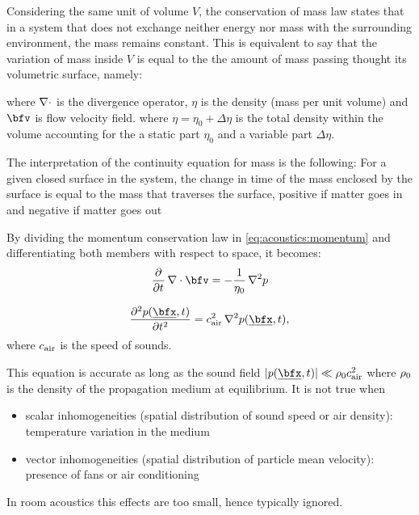 Considering the same unit of volume $V$, the conservation of mass law states that in a system that does not exchange
neither energy nor mass with the surrounding environment, the mass remains constant.
This is equivalent to say that the variation of mass inside $V$ is equal to the the amount of mass passing thought its volumetric surface, namely:


where $\mathop{}\!\mathbin{\nabla}\cdot$ is the divergence operator, $\eta$ is the density (mass per unit volume) and $\bfv$ is flow velocity field.
where $\eta = \eta_0 + \Delta\eta$ is the total density within the volume accounting for the a static part $\eta_0$ and a variable part $\Delta\eta$.

The interpretation of the continuity equation for mass is the following: For a given closed surface in the system,
the change in time of the mass enclosed by the surface is equal to the mass that traverses the surface, positive if matter goes in and negative if matter goes out

By dividing the momentum conservation law in \cref{eq:acoustics:momentum} and differentiating both members with respect to space, it becomes:
\begin{equation}
    \kpderiv[]{}{t} \knabla\cdot \bfv = - \frac{1}{\volumeUnit} \knabla^2 p
\end{equation}



\begin{equation}
    \label{eq:acoustics:wave}
    \kpderiv[2]{\pressure(\positionMicrophone, t)}{t} = \cair^2 \knabla^2 \pressure(\positionMicrophone, t)
    ,
\end{equation}
where $c_\text{air}$ is the speed of sounds.

This equation is accurate as long as the sound field $\abs{\pressure(\positionMicrophone, t)} \ll \densityEq \cair^2$
where $\rho_0$ is the density of the propagation medium at equilibrium. It is not true when
\begin{itemize}
    \item scalar inhomogeneities (spatial distribution of sound speed or air density): temperature variation in the medium
    \item vector inhomogeneities (spatial distribution of particle mean velocity): presence of fans or air conditioning
\end{itemize}
In room acoustics this effects are too small, hence typically ignored.

